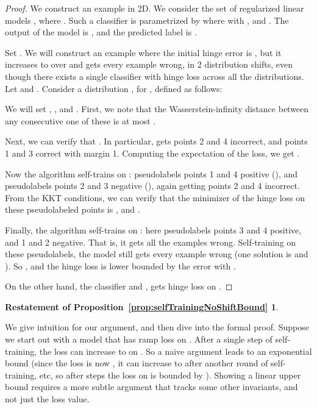 \documentclass[11pt]{article}
\begin{document}
\begin{proof}

We construct an example in 2D.
We consider the set of regularized linear models , where .
Such a classifier is parametrized by  where  with , and .
The output of the model is , and the predicted label is .

Set .
We will construct an example where the initial hinge error is , but it increases to over  and gets every example wrong, in 2 distribution shifts, even though there exists a single classifier with  hinge loss across all the distributions.
Let  and .
Consider a distribution , for , defined as follows:

We will set , , and .
First, we note that the Wasserstein-infinity distance between any consecutive one of these is at most .

Next, we can verify that .
In particular,  gets points 2 and 4 incorrect, and points 1 and 3 correct with margin 1.
Computing the expectation of the loss, we get .

Now the algorithm self-trains on :  pseudolabels points 1 and 4 positive (), and pseudolabels points 2 and 3 negative (), again getting points 2 and 4 incorrect.
From the KKT conditions, we can verify that the minimizer of the hinge loss on these pseudolabeled points is , and .

Finally, the algorithm self-trains on : here  pseudolabels points 3 and 4 positive, and 1 and 2 negative.
That is, it gets all the examples wrong.
Self-training on these pseudolabels, the model still gets every example wrong (one solution is  and ).
So , and the hinge loss is lower bounded by the error with .

On the other hand, the classifier  and , gets hinge loss  on .

\end{proof}


\newtheorem*{selfTrainingNoShiftBoundProp}{Restatement of Proposition~\ref{prop:selfTrainingNoShiftBound}}

\begin{selfTrainingNoShiftBoundProp}
\selfTrainingNoShiftBoundText{}
\end{selfTrainingNoShiftBoundProp}

\newcommand{\unlabeledL}{\ensuremath{U_r}}
We give intuition for our argument, and then dive into the formal proof.
Suppose we start out with a model that has ramp loss  on .
After a single step of self-training, the loss can increase to  on .
So a naive argument leads to an exponential bound (since the loss is now , it can increase to  after another round of self-training, etc, so after  steps the loss on  is bounded by ).
Showing a linear upper bound requires a more subtle argument that tracks some other invariants, and not just the loss value.
\end{document}
